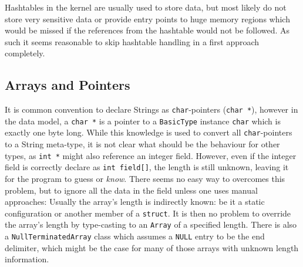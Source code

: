 Hashtables in the kernel are usually used to store data, but most likely do not store very sensitive data or provide entry points to huge memory regions which would be missed if the references from the hashtable would not be followed.
As such it seems reasonable to skip hashtable handling in a first approach completely.

\subsection{Arrays and Pointers}
It is common convention to declare Strings as \texttt{char}-pointers (\texttt{char *}), however in the data model, a \texttt{char *} is a pointer to a \texttt{BasicType} instance \texttt{char} which is exactly one byte long.
While this knowledge is used to convert all \texttt{char}-pointers to a String meta-type, it is not clear what should be the behaviour for other types, as \texttt{int *} might also reference an integer field.
However, even if the integer field is correctly declare as \texttt{int field[]}, the length is still unknown,
leaving it for the program to guess or \emph{know}.
There seems no easy way to overcomes this problem, but to ignore all the data in the field unless one uses manual approaches:
Usually the array’s length is indirectly known: be it a static configuration or another member of a \texttt{struct}.
It is then no problem to override the array’s length by type-casting to an \texttt{Array} of a specified length.
There is also a \texttt{NullTerminatedArray} class which assumes a \texttt{NULL} entry to be the end delimiter,
which might be the case for many of those arrays with unknown length information.
